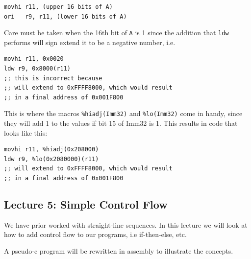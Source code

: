 \documentclass[10pt]{article}
\begin{document}
\begin{listing}[H]
\begin{verbatim}
movhi r11, (upper 16 bits of A)
ori   r9, r11, (lower 16 bits of A)
\end{verbatim}
\end{listing}


Care must be taken when the 16th bit of \texttt{A}  is 1 since the addition that \texttt{ldw} performs will sign extend it to be a negative number, i.e. 

\begin{listing}[H]
	\begin{verbatim}
movhi r11, 0x0020
ldw r9, 0x8000(r11)
;; this is incorrect because
;; will extend to 0xFFFF8000, which would result
;; in a final address of 0x001F800
\end{verbatim}
\end{listing}


This is where the macros \texttt{\%hiadj(Imm32)}  and \texttt{\%lo(Imm32)} come in handy, since they will add 1 to the values if bit 15 of Imm32 is 1. 
This results in code that looks like this:


\begin{listing}[H]
	\begin{verbatim}
movhi r11, %hiadj(0x208000)
ldw r9, %lo(0x2080000)(r11)
;; will extend to 0xFFFF8000, which would result
;; in a final address of 0x001F800
\end{verbatim}
\end{listing}



\subsection{Lecture 5: Simple Control Flow}

We have prior worked with straight-line sequences.
In this lecture we will look at how to add control flow to our programs, i.e if-then-else, etc.



A pseudo-c program will be rewritten in assembly to illustrate the concepts.
\end{document}
